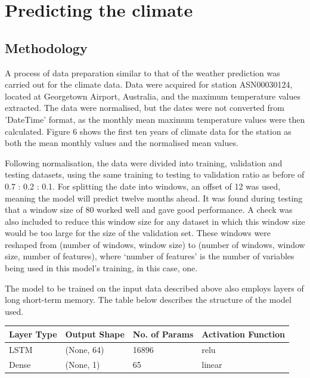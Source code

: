 \documentclass[12pt]{article}
\begin{document}
\section{Predicting the climate}

    \subsection{Methodology}

    A process of data preparation similar to that of the weather prediction was carried out for the climate data. Data were acquired for station ASN00030124, located at Georgetown Airport, Australia, and the maximum temperature values extracted. The data were normalised, but the dates were not converted from 'DateTime' format, as the monthly mean maximum temperature values were then calculated. Figure 6 shows the first ten years of climate data for the station as both the mean monthly values and the normalised mean values.
    
    Following normalisation, the data were divided into training, validation and testing datasets, using the same training to testing to validation ratio as before of 0.7 : 0.2 : 0.1. For splitting the date into windows, an offset of 12 was used, meaning the model will predict twelve months ahead. It was found during testing that a window size of 80 worked well and gave good performance. A check was also included to reduce this window size for any dataset in which this window size would be too large for the size of the validation set. These windows were reshaped from (number of windows, window size) to (number of windows, window size, number of features), where ‘number of features’ is the number of variables being used in this model’s training, in this case, one.
    
    The model to be trained on the input data described above also employs layers of long short-term memory. The table below describes the structure of the model used.
    
    \begin{table}[H]
    \centering
        \begin{tabular}{ |p{2.5cm}|p{4cm}|p{3.5cm}|p{4cm}| }
         \hline
         Layer Type & Output Shape & No. of Params & Activation Function \\
         \hline
         LSTM  & (None, 64) &  16896 & relu   \\
         Dense & (None, 1)  &  65    & linear \\
         \hline
        \end{tabular}
    \end{table}
\end{document}
